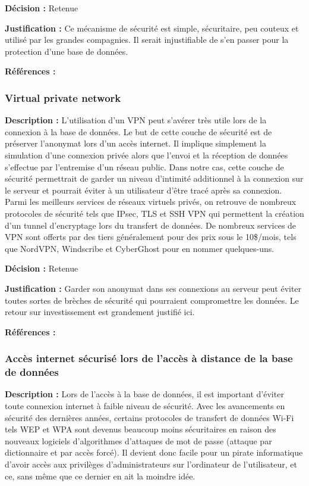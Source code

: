 \textbf{Décision :}  Retenue

\textbf{Justification :}  Ce mécanisme de sécurité est simple, sécuritaire, peu couteux et utilisé par les grandes compagnies. Il serait injustifiable de s’en passer pour la protection d’une base de données.

\textbf{Références :} 

\subsubsection{Virtual private network}

\textbf{Description :} L’utilisation d’un VPN peut s’avérer très utile lors de la connexion à la base de données. Le but de cette couche de sécurité est de préserver l’anonymat lors d’un accès internet. Il implique simplement la simulation d’une connexion privée alors que l’envoi et la réception de données s’effectue par l’entremise d’un réseau public. Dans notre cas, cette couche de sécurité permettrait de garder un niveau d’intimité additionnel à la connexion sur le serveur et pourrait éviter à un utilisateur d’être tracé après sa connexion. Parmi les meilleurs services de réseaux virtuels privés, on retrouve de nombreux protocoles de sécurité tels que IPsec, TLS et SSH VPN qui permettent la création d’un tunnel d’encryptage lors du transfert de données. De nombreux services de VPN sont offerts par des tiers généralement pour des prix sous le 10\$/mois, tels que NordVPN, Windscribe et CyberGhost pour en nommer quelques-uns.

\textbf{Décision :} Retenue

\textbf{Justification :} Garder son anonymat dans ses connexions au serveur peut éviter toutes sortes de brèches de sécurité qui pourraient compromettre les données. Le retour sur investissement est grandement justifié ici.

\textbf{Références :} 

\subsubsection{Accès internet sécurisé lors de l’accès à distance de la base de données}

\textbf{Description :} Lors de l’accès à la base de données, il est important d’éviter toute connexion internet à faible niveau de sécurité. Avec les avancements en sécurité des dernières années, certains protocoles de transfert de données Wi-Fi tels WEP et WPA sont devenus beaucoup moins sécuritaires en raison des nouveaux logiciels d’algorithmes d’attaques de mot de passe (attaque par dictionnaire et par accès forcé). Il devient donc facile pour un pirate informatique d’avoir accès aux privilèges d’administrateurs sur l’ordinateur de l’utilisateur, et ce, sans même que ce dernier en ait la moindre idée.

